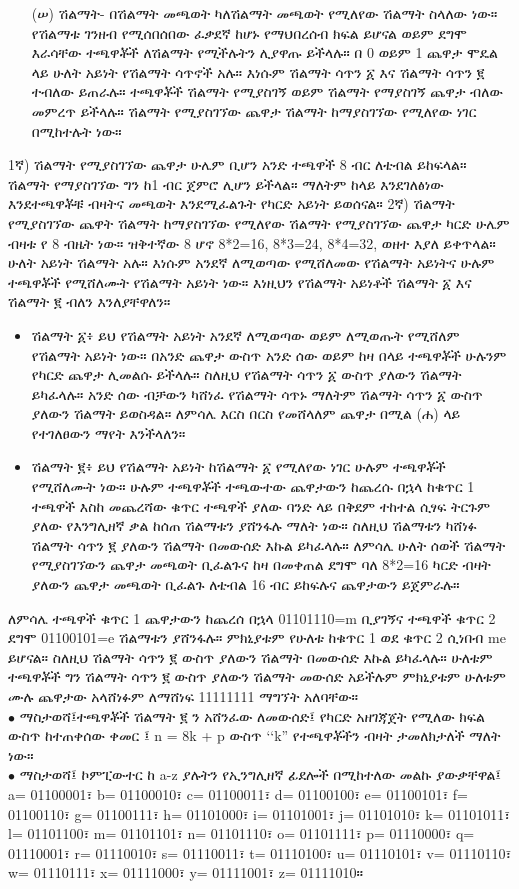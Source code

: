 \documentclass[a4paper,12pt]{article}
\begin{document}
\begin{enumerate}
\item[(ሠ)] {\color{red}ሽልማት}- በሽልማት መጫወት ካለሽልማት መጫወት የሚለየው ሽልማት ስላለው ነው። የሽልማቱ ገንዘብ የሚሰበሰበው ፈቃደኛ ከሆኑ የማህበረሰብ ክፍል ይሆናል ወይም ደግሞ እራሳቸው ተጫዋቾች ለሽልማት የሚችሉትን ሊያዋጡ ይችላሉ። በ 0 ወይም 1 ጨዋታ ሞዴል ላይ ሁለት አይነት የሽልማት ሳጥኖች አሉ። እነሱም {\color{red}ሽልማት ሳጥን ፩} እና {\color{red}ሽልማት ሳጥን ፪} ተብለው ይጠራሉ። ተጫዋቾች ሽልማት የሚያስገኝ ወይም ሽልማት የማያስገኝ ጨዋታ ብለው መምረጥ ይችላሉ። ሽልማት የሚያስገኘው ጨዋታ ሽልማት ከማያስገኘው  የሚለየው ነገር በሚከተሉት ነው።
\end{enumerate}
\justify
{\color{red}1ኛ)} ሽልማት የሚያስገኘው ጨዋታ ሁሌም ቢሆን አንድ ተጫዋች 8 ብር ለቴብል ይከፍላል። ሽልማት የማያስገኘው ግን ከ1 ብር ጀምሮ ሊሆን ይችላል። ማለትም ከላይ እንደገለፅነው እንደተጫዋቾቹ ብዛትና መጫወት እንደሚፈልጉት የካርድ አይነት ይወሰናል።
\justify
{\color{red}2ኛ)} ሽልማት የሚያስገኘው ጨዋት ሽልማት ከማያስገኘው የሚለየው ሽልማት የሚያስገኘው ጨዋታ ካርድ ሁሌም ብዛቱ የ 8 ብዜት ነው። ዝቅተኛው 8 ሆኖ 8*2=16, 8*3=24, 8*4=32, ወዘተ እያለ ይቀጥላል። ሁለት አይነት ሽልማት አሉ። እነሱም አንደኛ ለሚወጣው የሚሸለመው የሽልማት አይነትና ሁሉም ተጫዋቾች የሚሸለሙት የሽልማት አይነት ነው። እነዚህን የሽልማት አይነቶች {\color{red}ሽልማት ፩} እና {\color{red}ሽልማት ፪} ብለን እንለያቸዋለን።
\begin{itemize}
\item {\color{red}ሽልማት ፩}፥ ይህ የሽልማት አይነት አንደኛ ለሚወጣው ወይም ለሚወጡት የሚሸለም የሽልማት አይነት ነው። በአንድ ጨዋታ ውስጥ አንድ ሰው ወይም ከዛ በላይ ተጫዋቾች ሁሉንም የካርድ ጨዋታ ሊመልሱ ይችላሉ። ስለዚህ የሽልማት ሳጥን ፩ ውስጥ ያለውን ሽልማት ይካፈላሉ። አንድ ሰው ብቻውን ካሸነፈ የሽልማት ሳጥኑ ማለትም ሽልማት ሳጥን ፩ ውስጥ ያለውን ሽልማት ይወስዳል። ለምሳሌ እርስ በርስ የመሸላለም ጨዋታ በሚል (ሐ) ላይ የተገለፀውን ማየት እንችላለን።
\item {\color{red}ሽልማት ፪}፥ ይህ የሽልማት አይነት ከሽልማት ፩ የሚለየው ነገር ሁሉም ተጫዋቾች የሚሸለሙት ነው። ሁሉም ተጫዋቾች ተጫውተው ጨዋታውን ከጨረሱ በኋላ ከቁጥር 1 ተጫዋች እስከ መጨረሻው ቁጥር ተጫዋች ያለው ባንድ ላይ በቅደም ተከተል ሲፃፍ ትርጉም ያለው የእንግሊዘኛ ቃል ከሰጠ ሽልማቱን ያሸንፋሉ ማለት ነው። ስለዚህ ሽልማቱን ካሸነፉ ሽልማት ሳጥን ፪ ያለውን ሽልማት በመውሰድ እኩል ይካፈላሉ። ለምሳሌ ሁለት ሰወች ሽልማት የሚያስገኘውን ጨዋታ መጫወት ቢፈልጉና ከዛ በመቀጠል ደግሞ ባለ 8*2=16 ካርድ ብዛት ያለውን ጨዋታ መጫወት ቢፈልጉ ለቴብል 16 ብር ይከፍሉና ጨዋታውን ይጀምራሉ።
\end{itemize}
\justify
ለምሳሌ ተጫዋች ቁጥር 1 ጨዋታውን ከጨረሰ በኋላ 01101110=m ቢያገኝና ተጫዋች ቁጥር 2 ደግሞ 01100101=e ሽልማቱን ያሸንፋሉ። ምክኒያቱም የሁለቱ ከቁጥር 1 ወደ ቁጥር 2 ሲነበብ me ይሆናል። ስለዚህ ሽልማት ሳጥን ፪ ውስጥ ያለውን ሽልማት በመውሰድ እኩል ይካፈላሉ። ሁለቱም ተጫዋቾች ግን ሽልማት ሳጥን ፪ ውስጥ ያለውን ሽልማት መውሰድ አይችሉም ምክኒያቱም ሁለቱም ሙሉ ጨዋታው አላሸነፉም ለማሸነፍ 11111111 ማግኘት አለባቸው።\\
{\color{blue}$\bullet$} {\color{red}ማስታወሻ፤}ተጫዋቾች ሽልማት ፪ ን አሸንፈው ለመውሰድ፤ የካርድ አዘገጃጀት የሚለው ክፍል ውስጥ ከተጠቀሰው ቀመር ፤ n = 8k + p ውስጥ ‘‘k” የተጫዋቾችን ብዛት ታመለክታለች ማለት ነው።\\ 
{\color{blue}$\bullet$} {\color{red}ማስታወሻ፤} ኮምፒውተር ከ a-z ያሉትን የኢንግሊዘኛ ፊደሎች በሚከተለው መልኩ ያውቃቸዋል፤ a= 01100001፣ b= 01100010፣ c= 01100011፣ d= 01100100፣ e= 01100101፣ f= 01100110፣ g= 01100111፣ h= 01101000፣ i= 01101001፣ j= 01101010፣ k= 01101011፣ l= 01101100፣ m= 01101101፣ n= 01101110፣ o= 01101111፣ p= 01110000፣ q= 01110001፣ r= 01110010፣ s= 01110011፣ t= 01110100፣ u= 01110101፣ v= 01110110፣ w= 01110111፣ x= 01111000፣ y= 01111001፣ z= 01111010።
\end{document}

